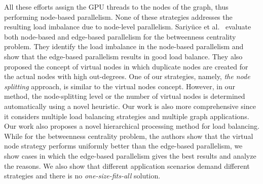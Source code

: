 All these efforts assign the GPU threads to the nodes of the graph, thus performing node-based parallelism. None of these strategies addresses the resulting load imbalance due to node-level parallelism. Sariy{\"u}ce et al.~\cite{sariyuce-bc-gpgpu2013} evaluate both node-based and edge-based parallelism for the betweenness centrality problem. They identify the load imbalance in the node-based parallelism and show that the edge-based parallelism results in good load balance. They also proposed the concept of virtual nodes in which duplicate nodes are created for the actual nodes with high out-degrees. One of our strategies, namely, {\em the node splitting} approach, is similar to the virtual nodes concept. However, in our method, the node-splitting level or the number of virtual nodes is determined automatically using a novel heuristic. Our work is also more comprehensive since it considers multiple load balancing strategies and multiple graph applications. Our work also proposes a novel hierarchical processing method for load balancing. While for the betweenness centrality problem, the authors show that the virtual node strategy performs uniformly better than the edge-based parallelism, we show cases in which the edge-based parallelism gives the best results and analyze the reasons.
We also show that different application scenarios demand different strategies and there is no \textit{one-size-fits-all} solution.
